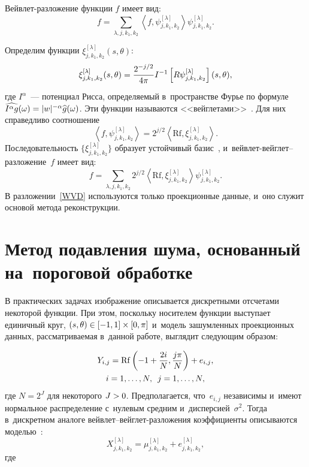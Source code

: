 \begin{multicols}{2}
Вейвлет-разложение функции $f$ имеет вид:
\begin{equation*}                                                                   
f = \sum\limits_{\lambda,j,k_1,k_2}\left \langle 
f,\psi^{[\lambda]}_{j,k_1,k_2}\right\rangle \psi^{[\lambda]}_{j,k_1,k_2}.
\end{equation*}


Определим функции $\xi_{j,k_1,k_2}^{[\lambda]}(s,\theta)$:
\begin{equation*}
\xi_{j,k_1,k_2}^{[\lambda]}(s,\theta) = 
\displaystyle\frac{\displaystyle 2^{-j/2}\mathstrut}{\displaystyle 4\pi\mathstrut} I^{-1}\left[R\psi_{j,k_1,k_2}^{[\lambda]}
\right](s,\theta),
\end{equation*}
где $I^{\alpha}$~--- потенциал Рисса, определяемый в~пространстве 
Фурье по формуле $\widehat{I^{\alpha} g}(\omega) \hm= 
|w|^{-\alpha} \widehat{g}(\omega)$.
Эти функции называются <<вейглетами>>~\cite{D94}. 
Для них справедливо соотношение
\begin{equation*}
\left\langle f,\psi_{j,k_1,k_2}^{[\lambda]}\right\rangle=
2^{j/2}\left\langle \mathrm{Rf}, \xi_{j,k_1,k_2}^{[\lambda]}\right\rangle.
\end{equation*}
Последовательность $\{\xi_{j,k_1,k_2}^{[\lambda]}\}$ 
образует устойчивый базис~\cite{Lee97}, и~вейв\-лет-вейг\-лет--раз\-ло\-же\-ние~$f$ 
имеет вид:
\begin{equation}                                                                   
\label{WVD}
f = \sum\limits_{\lambda,j,k_1,k_2} 2^{j/2}\left\langle \mathrm{Rf}, 
\xi_{j,k_1,k_2}^{[\lambda]}\right\rangle \psi^{[\lambda]}_{j,k_1,k_2}.
\end{equation}
В разложении~\eqref{WVD} используются только проекционные данные, 
и~оно служит основой метода реконструкции.

\vspace*{-6pt}

\section{Метод подавления шума, основанный на~пороговой обработке}

В практических задачах изображение описывается дискретными
 отсчетами некоторой функции. При этом, поскольку носителем 
 функции выступает единичный круг, $(s,\theta)\hm\in [-1,1]\times[0,\pi]$ 
 и~модель зашумленных проекционных данных, рас\-смат\-ри\-ва\-емая в~данной работе, 
 выглядит следующим об\-разом:
 
 \noindent
\begin{multline*}
Y_{i,j} = \mathrm{Rf}\left(-1+\displaystyle\frac{\displaystyle 2i\mathstrut}{\displaystyle N\mathstrut},\displaystyle\frac{\displaystyle j\pi\mathstrut}{\displaystyle N\mathstrut}\right) + e_{i,j}, \\
i = 1, \dots, N, \enskip j = 1, \dots, N,
\end{multline*}
где $N=2^J$ для некоторого $J\hm>0$. Предполагается, что~$e_{i,j}$ 
независимы и~имеют нормальное распределение с~нулевым 
средним и~дисперсией~$\sigma^2$.
Тогда в~дискретном аналоге вейв\-лет--вейг\-лет-раз\-ло\-же\-ния 
коэффициенты описываются моделью~\cite{ESH14}:
\begin{equation}
X_{j,k_1,k_2}^{[\lambda]} = \mu_{j,k_1,k_2}^{[\lambda]} + 
 e_{j,k_1,k_2}^{[\lambda]},
\label{WVD_model}
\end{equation}
где 


\end{multicols}
